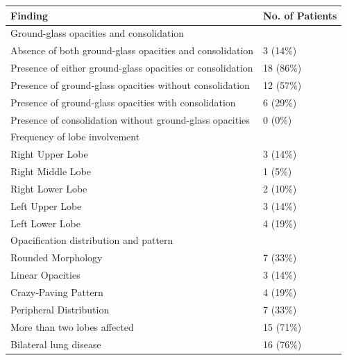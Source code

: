 \begin{longtable}{| p{} | p{} |} 
\hline
\textbf{Finding} & \textbf{No. of Patients} \\
\hline
Ground-glass opacities and consolidation & \\
\quad Absence of both ground-glass opacities and consolidation & 3 (14\%)\\ 
\quad Presence of either ground-glass opacities or consolidation & 18 (86\%)\\
\quad Presence of ground-glass opacities without consolidation & 12 (57\%)\\
\quad Presence of ground-glass opacities with consolidation & 6 (29\%)\\
\quad Presence of consolidation without ground-glass opacities & 0 (0\%)\\ \hline
Frequency of lobe involvement & \\ 
\quad Right Upper Lobe & 3 (14\%)\\
\quad Right Middle Lobe & 1 (5\%)\\
\quad Right Lower Lobe & 2 (10\%)\\
\quad Left Upper Lobe & 3 (14\%)\\ 
\quad Left Lower Lobe & 4 (19\%)\\ \hline
Opacification distribution and pattern & \\ 
 \quad Rounded Morphology & 7 (33\%)\\ 
 \quad Linear Opacities & 3 (14\%)\\ 
 \quad Crazy-Paving Pattern & 4 (19\%)\\ 
 \quad Peripheral Distribution & 7 (33\%)\\  \hline
More than two lobes affected & 15 (71\%)\\ \hline
Bilateral lung disease & 16 (76\%)\\ \hline
 

\end{longtable}
